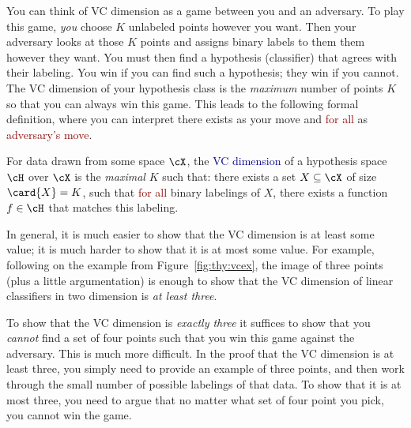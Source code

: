 
You can think of VC dimension as a game between you and an adversary.
To play this game, \emph{you} choose $K$ unlabeled points however you
want.  Then your adversary looks at those $K$ points and assigns
binary labels to them them however they want.  You must then find a
hypothesis (classifier) that agrees with their labeling.  You win if you
can find such a hypothesis; they win if you cannot.  The VC dimension
of your hypothesis class is the \emph{maximum} number of points $K$ so
that you can always win this game.  This leads to the following formal
definition, where you can interpret \textcolor{darkergreen}{there
  exists} as \textcolor{darkergreen}{your move} and
\textcolor{darkred}{for all} as \textcolor{darkred}{adversary's move}.

\begin{definition} \label{def:thy:vc} For data drawn from some space
  $\cX$, the \textcolor{darkblue}{VC dimension} of a hypothesis space
  $\cH$ over $\cX$ is the \emph{maximal} $K$ such that:
  \textcolor{darkergreen}{there exists} a set $X \subseteq \cX$ of
  size $\card{X}=K$, such that \textcolor{darkred}{for all} binary
  labelings of $X$, \textcolor{darkergreen}{there exists} a function
  $f \in \cH$ that matches this labeling.
\end{definition}

In general, it is much easier to show that the VC dimension is at
least some value; it is much harder to show that it is at most some
value.  For example, following on the example from
Figure~\ref{fig:thy:vcex}, the image of three points (plus a little
argumentation) is enough to show that the VC dimension of linear
classifiers in two dimension is \emph{at least three}.

To show that the VC dimension is \emph{exactly three} it suffices to
show that you \emph{cannot} find a set of four points such that you
win this game against the adversary.  This is much more difficult.  In
the proof that the VC dimension is at least three, you simply need to
provide an example of three points, and then work through the small
number of possible labelings of that data.  To show that it is at most
three, you need to argue that no matter what set of four point you
pick, you cannot win the game.







